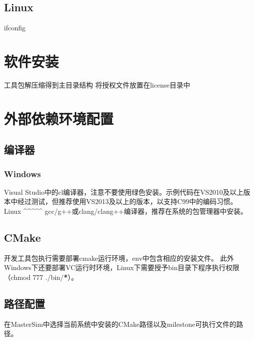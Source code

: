 \documentclass[letterpaper,10pt,english]{sphinxmanual}
\begin{document}
\subsection{Linux}
\label{\detokenize{install/_u8f6f_u4ef6_u5b89_u88c5:linux}}
ifconfig


\section{软件安装}
\label{\detokenize{install/_u8f6f_u4ef6_u5b89_u88c5:id2}}
工具包解压缩得到主目录结构
将授权文件放置在license目录中


\section{外部依赖环境配置}
\label{\detokenize{install/_u73af_u5883_u914d_u7f6e:id1}}\label{\detokenize{install/_u73af_u5883_u914d_u7f6e::doc}}

\subsection{编译器}
\label{\detokenize{install/_u73af_u5883_u914d_u7f6e:id2}}

\subsubsection{Windows}
\label{\detokenize{install/_u73af_u5883_u914d_u7f6e:windows}}
Visual Studio中的cl编译器，注意不要使用绿色安装。示例代码在VS2010及以上版本中经过测试，但推荐使用VS2013及以上的版本，以支持C99中的编码习惯。
Linux
\textasciicircum{}\textasciicircum{}\textasciicircum{}\textasciicircum{}\textasciicircum{}
gcc/g++或clang/clang++编译器，推荐在系统的包管理器中安装。


\subsection{CMake}
\label{\detokenize{install/_u73af_u5883_u914d_u7f6e:cmake}}
开发工具包执行需要部署cmake运行环境，env中包含相应的安装文件。
此外Windows下还要部署VC运行时环境，Linux下需要授予bin目录下程序执行权限（chmod 777 ./bin/{\color{red}\bfseries{}*}）。


\subsection{路径配置}
\label{\detokenize{install/_u73af_u5883_u914d_u7f6e:id5}}
在MasterSim中选择当前系统中安装的CMake路径以及milestone可执行文件的路径。
\end{document}
